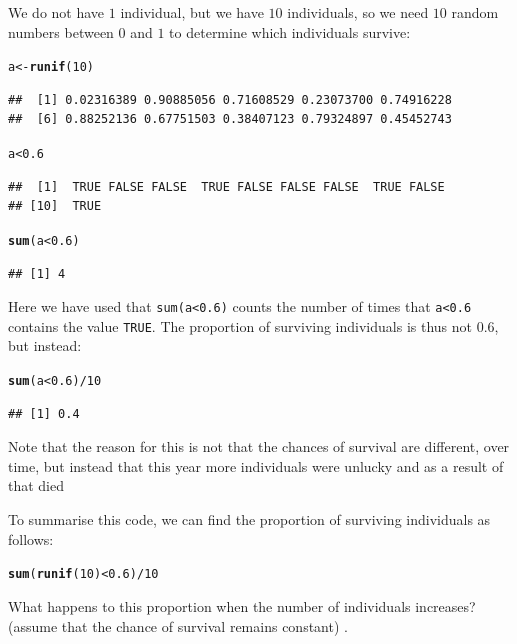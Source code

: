\documentclass{article}\usepackage[]{graphicx}\usepackage[]{color}
\makeatletter
\newcommand{\hlnum}[1]{\textcolor[rgb]{0.686,0.059,0.569}{#1}}%
\newcommand{\hlopt}[1]{\textcolor[rgb]{0,0,0}{#1}}%
\newcommand{\hlstd}[1]{\textcolor[rgb]{0.345,0.345,0.345}{#1}}%
\newcommand{\hlkwb}[1]{\textcolor[rgb]{0.69,0.353,0.396}{#1}}%
\newcommand{\hlkwd}[1]{\textcolor[rgb]{0.737,0.353,0.396}{\textbf{#1}}}%
\newenvironment{kframe}{%
 \def\at@end@of@kframe{}%
 \ifinner\ifhmode%
  \def\at@end@of@kframe{\end{minipage}}%
  \begin{minipage}{\columnwidth}%
 \fi\fi%
 \def\FrameCommand##1{\hskip\@totalleftmargin \hskip-\fboxsep
 \colorbox{shadecolor}{##1}\hskip-\fboxsep
     \hskip-\linewidth \hskip-\@totalleftmargin \hskip\columnwidth}%
 \MakeFramed {\advance\hsize-\width
   \@totalleftmargin\z@ \linewidth\hsize
   \@setminipage}}%
 {\par\unskip\endMakeFramed%
 \at@end@of@kframe}
\newenvironment{knitrout}{}{} %
\makeatother
\begin{document}
We do not have $1$ individual, but we have $10$ individuals, so we need $10$ random numbers between $0$ and $1$ to determine which individuals survive:
\begin{knitrout}
\color{fgcolor}\begin{kframe}
\begin{alltt}
\hlstd{a}\hlkwb{<-}\hlkwd{runif}\hlstd{(}\hlnum{10}\hlstd{)}
\end{alltt}
\begin{verbatim}
##  [1] 0.02316389 0.90885056 0.71608529 0.23073700 0.74916228
##  [6] 0.88252136 0.67751503 0.38407123 0.79324897 0.45452743
\end{verbatim}
\begin{alltt}
\hlstd{a}\hlopt{<}\hlnum{0.6}
\end{alltt}
\begin{verbatim}
##  [1]  TRUE FALSE FALSE  TRUE FALSE FALSE FALSE  TRUE FALSE
## [10]  TRUE
\end{verbatim}
\begin{alltt}
\hlkwd{sum}\hlstd{(a}\hlopt{<}\hlnum{0.6}\hlstd{)}
\end{alltt}
\begin{verbatim}
## [1] 4
\end{verbatim}
\end{kframe}
\end{knitrout}
Here we have used that \texttt{sum(a<0.6)} counts the number of times that \texttt{a<0.6} contains the value \texttt{TRUE}.
The proportion of surviving individuals is thus not $0.6$, but instead:
\begin{knitrout}
\color{fgcolor}\begin{kframe}
\begin{alltt}
\hlkwd{sum}\hlstd{(a}\hlopt{<}\hlnum{0.6}\hlstd{)}\hlopt{/}\hlnum{10}
\end{alltt}
\begin{verbatim}
## [1] 0.4
\end{verbatim}
\end{kframe}
\end{knitrout}
Note that the reason for this is not that the chances of survival are different, over time, but instead that this year more individuals were unlucky and as a result of that died

To summarise this code, we can find the proportion of surviving individuals as follows:
\begin{knitrout}
\color{fgcolor}\begin{kframe}
\begin{alltt}
\hlkwd{sum}\hlstd{(}\hlkwd{runif}\hlstd{(}\hlnum{10}\hlstd{)}\hlopt{<}\hlnum{0.6}\hlstd{)}\hlopt{/}\hlnum{10}
\end{alltt}
\end{kframe}
\end{knitrout}
What happens to this proportion when the number of individuals increases? (assume that the chance of survival remains constant) .
\end{document}
